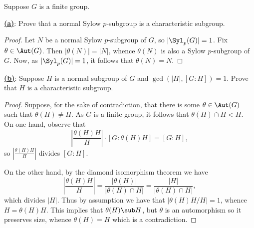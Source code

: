 \documentclass[12pt]{article}
\begin{document}
\begin{homeworkProblem}
  Suppose $G$ is a finite group.  

  \underline{\textbf{(a)}}: Prove that a normal Sylow $p$-subgroup is a characteristic subgroup.  
  \begin{proof}
    Let $ N $ be a normal Sylow $ p $-subgroup of $ G $, so $ |\Syl_{p}(G)| = 1 $. Fix $ \theta\in \Aut(G) $. Then $ | \theta(N)| = |N| $, whence $ \theta(N) $ is also a Sylow $ p $-subgroup of $ G $. Now, as $ |\Syl_{p}(G)| = 1 $, it follows that $ \theta(N) = N $.
  \end{proof}

  \underline{\textbf{(b)}}: Suppose $H$ is a normal subgroup of $G$ and $\gcd(\lvert H\rvert, [G:H]) = 1$. Prove that $H$ is a characteristic subgroup.  

  \begin{proof}
    Suppose, for the sake of contradiction, that there is some $ \theta\in \Aut(G)$ such that $ \theta(H)\neq H $. As $ G $ is a finite group, it follows that $ \theta(H)\cap H < H $.\\

    On one hand, observe that 
    \[
      \left|\frac{\theta(H)H}{H}\right|\cdot [G: \theta(H)H] = [G:H],
    \]
    so $ \left|\frac{\theta(H)H}{H}\right| $ divides $ [G:H] $.

    On the other hand, by the diamond isomorphism theorem we have 
    \[
      \left|\frac{\theta(H)H}{H}\right| = \frac{| \theta(H)|}{| \theta(H)\cap H|} = \frac{| H|}{| \theta(H)\cap H|},
    \]
    which divides $ |H| $. Thus by assumption we have that $ | \theta(H)H/H| = 1 $, whence $ H = \theta(H)H $. This implies that $ \theta(H) \sub H $, but $ \theta $ is an automorphism so it preserves size, whence $ \theta(H)= H $ which is a contradiction.
  \end{proof}

\end{homeworkProblem}
\end{document}
